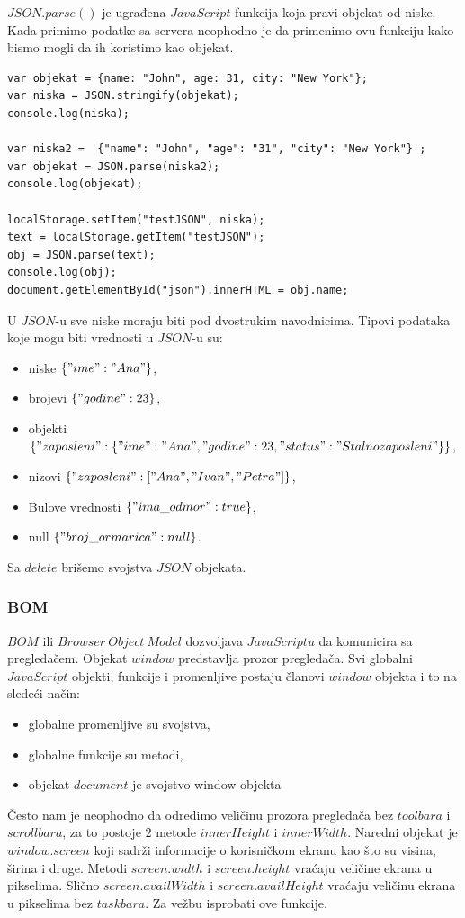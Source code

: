 $JSON.parse()$ je ugrađena $JavaScript$ funkcija koja pravi objekat od niske. Kada primimo podatke sa servera neophodno je da primenimo ovu funkciju kako bismo mogli da ih koristimo kao objekat.
\begin{lstlisting}[backgroundcolor = \color{lightgray}, breaklines=true]
var objekat = {name: "John", age: 31, city: "New York"};
var niska = JSON.stringify(objekat);
console.log(niska);
	
var niska2 = '{"name": "John", "age": "31", "city": "New York"}';
var objekat = JSON.parse(niska2);
console.log(objekat);

localStorage.setItem("testJSON", niska);
text = localStorage.getItem("testJSON");
obj = JSON.parse(text);
console.log(obj);
document.getElementById("json").innerHTML = obj.name;
\end{lstlisting}

U $JSON$-u sve niske moraju biti pod dvostrukim navodnicima. Tipovi podataka koje mogu biti vrednosti u $JSON$-u su:
\begin{itemize}
\item niske $\{ "ime":"Ana" \}$,
\item brojevi $\{ "godine": 23 \}$,
\item objekti $\{
"zaposleni":\{ "ime":"Ana", "godine":23, "status":"Stalno zaposleni" \}
 \}$,
\item nizovi $\{
"zaposleni":[ "Ana", "Ivan", "Petra" ]
\}$,
\item Bulove vrednosti $\{ "ima\_odmor":true \}$,
\item null $\{ "broj\_ormarica":null \}$.
\end{itemize}

Sa $delete$ brišemo svojstva $JSON$ objekata.

\subsubsection{BOM}

$BOM$ ili $Browser\ Object\ Model$ dozvoljava $JavaScriptu$ da komunicira sa pregledačem.
Objekat $window$ predstavlja prozor pregledača. Svi globalni $JavaScript$ objekti, funkcije i promenljive postaju članovi $window$ objekta i to na sledeći način:
\begin{itemize}
\item globalne promenljive su svojstva,
\item globalne funkcije su metodi, 
\item objekat $document$ je svojstvo window objekta
\end{itemize}
Često nam je neophodno da odredimo veličinu prozora pregledača bez $toolbara$ i $scrollbara$, za to postoje $2$ metode $innerHeight$ i $innerWidth$.
Naredni objekat je $window.screen$ koji sadrži informacije o korisničkom ekranu kao što su visina, širina i druge. Metodi $screen.width$ i $screen.height$ vraćaju veličine ekrana u pikselima. Slično $screen.availWidth$ i $screen.availHeight$ vraćaju veličinu ekrana u pikselima bez $task bara$. 
Za vežbu isprobati ove funkcije.\\\\

